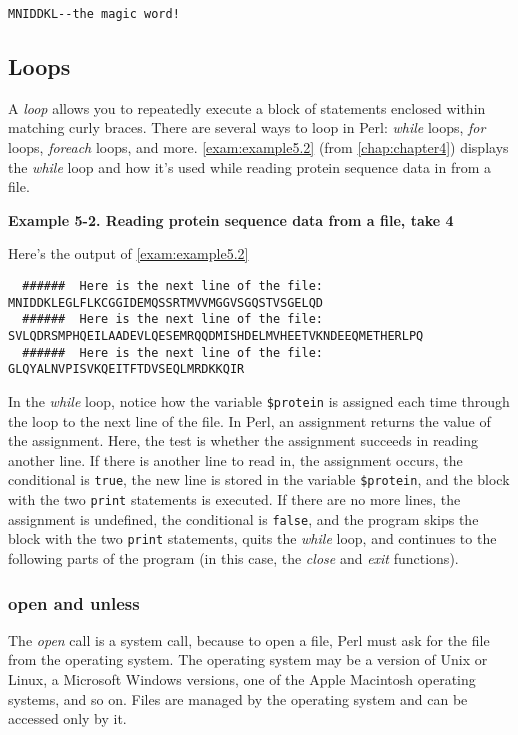 \begin{lstlisting}
MNIDDKL--the magic word!
\end{lstlisting}

\subsection{Loops}
A \textit{loop} allows you to repeatedly execute a block of statements enclosed within matching curly braces. There are several ways to loop in Perl: \textit{while} loops, \textit{for} loops, \textit{foreach} loops, and more. \autoref{exam:example5.2} (from \autoref{chap:chapter4}) displays the \textit{while} loop and how it's used while reading protein sequence data in from a file. 

\textbf{Example 5-2. Reading protein sequence data from a file, take 4 }


Here's the output of \autoref{exam:example5.2}

\begin{lstlisting}
  ######  Here is the next line of the file:
MNIDDKLEGLFLKCGGIDEMQSSRTMVVMGGVSGQSTVSGELQD
  ######  Here is the next line of the file:
SVLQDRSMPHQEILAADEVLQESEMRQQDMISHDELMVHEETVKNDEEQMETHERLPQ
  ######  Here is the next line of the file:
GLQYALNVPISVKQEITFTDVSEQLMRDKKQIR
\end{lstlisting}

In the \textit{while} loop, notice how the variable \verb|$protein| is assigned each time through the loop to the next line of the file. In Perl, an assignment returns the value of the assignment. Here, the test is whether the assignment succeeds in reading another line. If there is another line to read in, the assignment occurs, the conditional is \verb|true|, the new line is stored in the variable \verb|$protein|, and the block with the two \verb|print| statements is executed. If there are no more lines, the assignment is undefined, the conditional is \verb|false|, and the program skips the block with the two \verb|print| statements, quits the \textit{while} loop, and continues to the following parts of the program (in this case, the \textit{close} and \textit{exit} functions). 

\subsubsection{open and unless}
The \textit{open} call is a system call, because to open a file, Perl must ask for the file from the operating system. The operating system may be a version of Unix or Linux, a Microsoft Windows versions, one of the Apple Macintosh operating systems, and so on. Files are managed by the operating system and can be accessed only by it.

